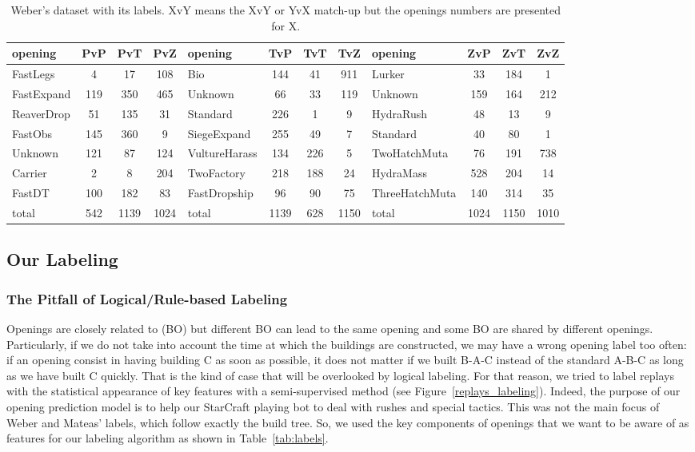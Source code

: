 \begin{table}[!h]
\begin{center}
\begin{footnotesize}
\begin{tabular}{|l|c|c|c|l|c|c|c|l|c|c|c|}
\hline
opening & PvP & PvT & PvZ & opening & TvP & TvT & TvZ & opening & ZvP & ZvT & ZvZ \\
\hline
FastLegs & 4 & 17 & 108 & Bio & 144 & 41 & 911 & Lurker & 33 & 184 & 1 \\
FastExpand & 119 & 350 & 465 & Unknown & 66 & 33 & 119 & Unknown & 159 & 164 & 212 \\
ReaverDrop & 51 & 135 & 31 & Standard & 226 & 1 & 9 & HydraRush & 48 & 13 & 9 \\
FastObs & 145 & 360 & 9 & SiegeExpand & 255 & 49 & 7 & Standard & 40 & 80 & 1 \\
Unknown & 121 & 87 & 124 & VultureHarass & 134 & 226 & 5 & TwoHatchMuta & 76 & 191 & 738 \\
Carrier & 2 & 8 & 204 & TwoFactory & 218 & 188 & 24 &  HydraMass & 528 & 204 & 14 \\
FastDT & 100 & 182 & 83 & FastDropship & 96 & 90 & 75 & ThreeHatchMuta & 140 & 314 & 35 \\
\hline
total & 542 & 1139 & 1024 & total & 1139 & 628 & 1150 & total & 1024 & 1150 & 1010 \\
\hline
\end{tabular}
\end{footnotesize}
\end{center}
\caption{Weber's dataset with its labels. XvY means the XvY or YvX match-up but the openings numbers are presented for X.}
\label{tab:weberdatasetnumbers}
\end{table}

\subsection{Our Labeling}

\subsubsection{The Pitfall of Logical/Rule-based Labeling}
Openings are closely related to  (BO) but different BO can lead to the same opening and some BO are shared by different openings. Particularly, if we do not take into account the time at which the buildings are constructed, we may have a wrong opening label too often: if an opening consist in having building C as soon as possible, it does not matter if we built B-A-C instead of the standard A-B-C as long as we have built C quickly. That is the kind of case that will be overlooked by logical labeling. For that reason, we tried to label replays with the statistical appearance of key features with a semi-supervised method (see Figure~\ref{replays_labeling}). Indeed, the purpose of our opening prediction model is to help our StarCraft playing bot to deal with rushes and special tactics. This was not the main focus of Weber and Mateas' labels, which follow exactly the build tree. So, we used the key components of openings that we want to be aware of as features for our labeling algorithm as shown in Table~\ref{tab:labels}.

